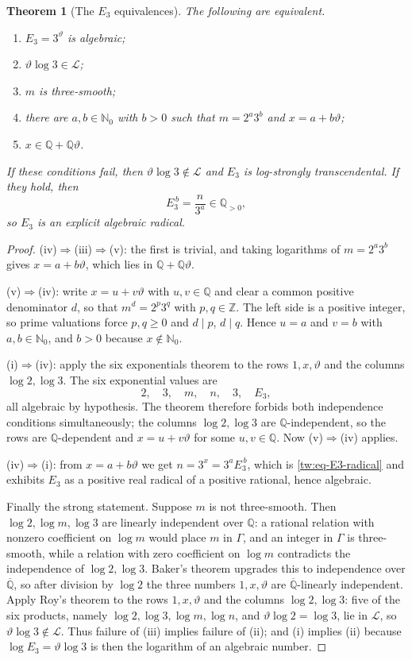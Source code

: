 \documentclass[11pt,oneside]{article}
\newtheorem{theorem}{Theorem}[section]
\theoremstyle{definition}
\theoremstyle{remark}
\newcommand{\Nzero}{\mathbb N_0}
\newcommand{\Z}{\mathbb Z}
\newcommand{\Q}{\mathbb Q}
\newcommand{\Abar}{\overline{\mathbb Q}}
\newcommand{\thetaq}{\vartheta}
\newcommand{\LL}{\mathcal L}
\newcommand{\GammaSat}{\Gamma}
\begin{document}
\begin{theorem}[The $E_3$ equivalences]
\label{tw:E3}
The following are equivalent.
\begin{enumerate}[label=\textup{(\roman*)}]
\item $E_3=3^{\thetaq}$ is algebraic;
\item $\thetaq\log3\in\LL$;
\item $m$ is three-smooth;
\item there are $a,b\in\Nzero$ with $b>0$ such that $m=2^a3^b$ and $x=a+b\thetaq$;
\item $x\in\Q+\Q\thetaq$.
\end{enumerate}
If these conditions fail, then $\thetaq\log3\notin\LL$ and $E_3$ is log-strongly
transcendental.  If they hold, then
\begin{equation}
 E_3^{\,b}=\frac{n}{3^a}\in\Q_{>0},
 \label{tw:eq-E3-radical}
\end{equation}
so $E_3$ is an explicit algebraic radical.
\end{theorem}

\begin{proof}
(iv)$\Rightarrow$(iii)$\Rightarrow$(v): the first is trivial, and taking logarithms of
$m=2^a3^b$ gives $x=a+b\thetaq$, which lies in $\Q+\Q\thetaq$.

(v)$\Rightarrow$(iv): write $x=u+v\thetaq$ with $u,v\in\Q$ and clear a common positive
denominator $d$, so that $m^d=2^p3^q$ with $p,q\in\Z$.  The left side is a positive integer,
so prime valuations force $p,q\ge0$ and $d\mid p$, $d\mid q$.  Hence $u=a$ and $v=b$ with
$a,b\in\Nzero$, and $b>0$ because $x\notin\Nzero$.

(i)$\Rightarrow$(iv): apply the six exponentials theorem to the rows $1,x,\thetaq$ and the
columns $\log2,\log3$.  The six exponential values are
\[
 2,\quad3,\quad m,\quad n,\quad3,\quad E_3,
\]
all algebraic by hypothesis.  The theorem therefore forbids both independence conditions
simultaneously; the columns $\log2,\log3$ are $\Q$-independent, so the rows are $\Q$-dependent
and $x=u+v\thetaq$ for some $u,v\in\Q$.  Now (v)$\Rightarrow$(iv) applies.

(iv)$\Rightarrow$(i): from $x=a+b\thetaq$ we get $n=3^x=3^aE_3^{\,b}$, which is
\eqref{tw:eq-E3-radical} and exhibits $E_3$ as a positive real radical of a positive rational,
hence algebraic.

Finally the strong statement.  Suppose $m$ is not three-smooth.  Then $\log2,\log m,\log3$ are
linearly independent over $\Q$: a rational relation with nonzero coefficient on $\log m$ would
place $m$ in $\GammaSat$, and an integer in $\GammaSat$ is three-smooth, while a relation with
zero coefficient on $\log m$ contradicts the independence of $\log2,\log3$.  Baker's theorem
upgrades this to independence over $\Abar$, so after division by $\log2$ the three numbers
$1,x,\thetaq$ are $\Abar$-linearly independent.  Apply Roy's theorem to the rows $1,x,\thetaq$
and the columns $\log2,\log3$: five of the six products, namely
$\log2,\log3,\log m,\log n$, and $\thetaq\log2=\log3$, lie in $\LL$, so
$\thetaq\log3\notin\LL$.  Thus failure of (iii) implies failure of (ii); and (i) implies (ii)
because $\log E_3=\thetaq\log3$ is then the logarithm of an algebraic number.
\end{proof}
\end{document}
